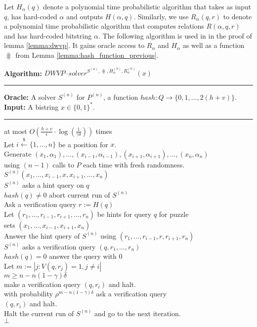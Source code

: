 Let $H_{\alpha}(q)$ denote a polynomial time probabilistic algorithm that takes as input $q$,
has hard-coded $\alpha$ and outputs $H(\alpha, q)$.
Similarly, we use $R_{\alpha}(q,r)$ to denote a polynomial time probabilistic algorithm that computes relations
$R(\alpha, q, r)$ and has hard-coded bitstring $\alpha$.
The following algorithm is used in \cite{Dodis:2009:SAI:1530441.1530450} in the proof of lemma \ref{lemma:dwvp}.
It gains oracle access to $R_{\alpha}$ and $H_{\alpha}$ as well as a function $\hash$ from Lemma \ref{lemma:hash_function_previous}.
%
\begin{codeblock}
  \textbf{Algorithm:} $\mathit{DWVP\text{--}solver}^{S^{(n)}, \hash, H_{\alpha}^{(n)}, R_{\alpha}^{(n)}}(x)$
  \medskip
  \hrule
  \textbf{Oracle:}  A solver $S^{(n)}$ for $P^{(n)}$, a function $hash : Q \rightarrow \{0,1, \dotsc, 2(h+v)\}$.\\
  \textbf{Input:} A bistring $x \in \{0,1\}^{*}$.
  \medskip\hrule
  \Repeat at most $O(\frac{h+v}{\epsilon} \cdot \log(\frac{1}{\gamma\delta}))$ times \\
  \IndI Let $i \xleftarrow{\$} \{1, \dotsc, n\}$ be a position for $x$.\\
  \IndI Generate $(x_1, \alpha_1), \dotsc, (x_{i-1}, \alpha_{i-1}), (x_{i+1}, \alpha_{i+1}), \dotsc, (x_n, \alpha_n)$ \\
  \IndI using $(n-1)$ calls to $P$ each time with fresh randomness.\\
  \IndI \Run $S^{(n)}(x_1, \dotsc, x_{i-1}, x, x_{i+1}, \dotsc, x_n)$\\
  \IndII \If $S^{(n)}$ asks a hint query on $q$ \Then \\
  \IndIII \If $hash(q) \neq 0$ \Then abort current run of $S^{(n)}$\\
  \IndIII Ask a verification query $r := H(q)$\\
  \IndIII Let $(r_1, \dotsc, r_{i-1}, r_{i+1}, \dotsc, r_{n})$ be hints for query $q$ for puzzle\\
  \IndIII sets $(x_1, \dotsc, x_{i-1}, x_{i+1}, x_n)$\\
  \IndIII Answer the hint query of $S^{(n)}$ using $(r_1, \dots, r_{i-1}, r, r_{i+1}, r_n)$\\
  \IndII \If $S^{(n)}$ asks a verification query $(q, r_1, \dots, r_n)$ \Then \\
  \IndIII \If $hash(q) = 0$ \Then answer the query with $0$\\
  \IndIII Let $m := |j: V(q,r_j) = 1, j \neq i|$\\
  \IndIII \If $m \geq n - n(1-\gamma)\delta$ \Then \\
  \IndIIII make a verification query $(q, r_i)$ and halt.\\
  \IndIII \Else with probability $\rho^{m - n(1-\gamma)\delta}$ ask a verification query \\
  \IndIIII $(q, r_i)$ and halt. \\
  \IndIII Halt the current run of $S^{(n)}$ and go to the next iteration.\\
  \Return $\bot$
\end{codeblock}

